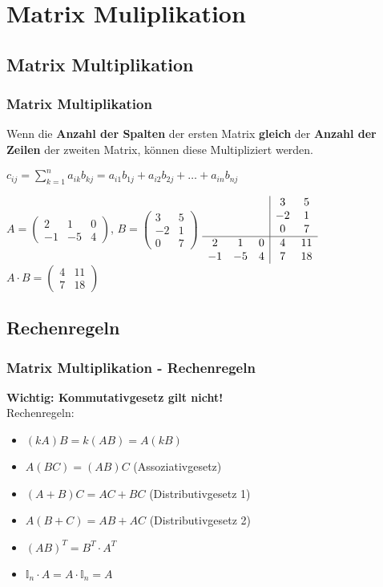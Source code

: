 \section{Matrix Muliplikation}
\subsection{Matrix Multiplikation}
\begin{frame}
\frametitle{Matrix Multiplikation}
Wenn die \textbf{Anzahl der Spalten} der ersten Matrix \textbf{gleich} der \textbf{Anzahl der Zeilen} der zweiten Matrix, können diese Multipliziert werden.

$c_{ij} = \sum_{k=1}^n a_{ik}b_{kj}= a_{i1}b_{1j} + a_{i2}b_{2j} + \dots + a_{in}b_{nj}$

$ A = \begin{pmatrix} 2 & 1 & 0 \\ -1 & -5 & 4 \end{pmatrix} $,
$ B = \begin{pmatrix} 3 & 5 \\ -2 & 1 \\ 0 & 7 \end{pmatrix} $
$
\begin{array}{c c c|c c}
& & & 3 & 5\\
& & & -2 & 1\\
& & & 0 & 7\\
\hline
2 & 1 & 0 & 4 & 11\\
-1 & -5 & 4 & 7 & 18\\
\end{array}
$
$ A \cdot B = \begin{pmatrix} 4 & 11 \\ 7 & 18 \end{pmatrix} $
\end{frame}

\subsection{Rechenregeln}
\begin{frame}
\frametitle{Matrix Multiplikation - Rechenregeln}
\textbf{Wichtig: Kommutativgesetz gilt nicht!}\\
Rechenregeln:
\begin{itemize}
\item $(kA)B = k(AB) = A(kB)$
\item $A(BC) = (AB)C$ (Assoziativgesetz)
\item $(A+B)C = AC + BC$ (Distributivgesetz 1)
\item $A(B+C) = AB + AC$ (Distributivgesetz 2)
\item $(AB)^T = B^T \cdot A^T$
\item $\mathbb{I}_n\cdot A = A\cdot \mathbb{I}_n = A$
\end{itemize}
\end{frame}

